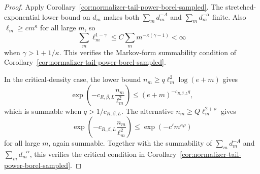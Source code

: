 \documentclass[11pt]{amsart}
\numberwithin{equation}{section}
\theoremstyle{definition}
\theoremstyle{remark}
\begin{document}
\begin{proof}
Apply Corollary~\ref{cor:normalizer-tail-power-borel-sampled}.  The
stretched-exponential lower bound on \(d_m\) makes both \(\sum_m d_m^{-A}\) and
\(\sum_m d_m^{-\alpha}\) finite.  Also \(\ell_m\ge c m^\kappa\) for all large
\(m\), so
\[
  \sum_m \ell_m^{1-\gamma}
  \le C\sum_m m^{-\kappa(\gamma-1)}<\infty
\]
when \(\gamma>1+1/\kappa\).  This verifies the Markov-form summability condition
of Corollary~\ref{cor:normalizer-tail-power-borel-sampled}.

In the critical-density case, the lower bound
\(n_m\ge q\ell_m^2\log(e+m)\) gives
\[
  \exp\left(-c_{R,\beta,L}\frac{n_m}{\ell_m^2}\right)
  \le (e+m)^{-c_{R,\beta,L}q},
\]
which is summable when \(q>1/c_{R,\beta,L}\).  The alternative
\(n_m\ge Q\ell_m^{2+\rho}\) gives
\[
  \exp\left(-c_{R,\beta,L}\frac{n_m}{\ell_m^2}\right)
  \le \exp(-c' m^{\kappa\rho})
\]
for all large \(m\), again summable.  Together with the summability of
\(\sum_m d_m^{-A}\) and \(\sum_m d_m^{-\alpha}\), this verifies the critical
condition in Corollary~\ref{cor:normalizer-tail-power-borel-sampled}.
\end{proof}
\end{document}
